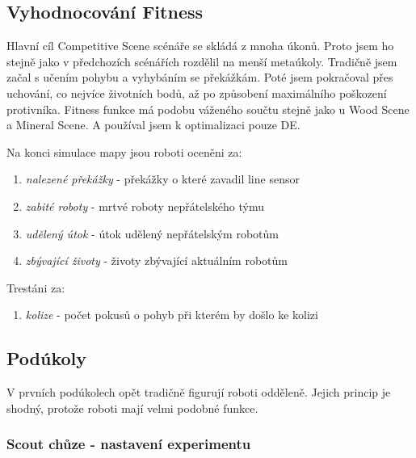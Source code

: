 \subsection{Vyhodnocování Fitness}
Hlavní cíl Competitive Scene scénáře se skládá z mnoha úkonů. Proto jsem ho stejně jako v předchozích scénářích rozdělil na menší metaúkoly. Tradičně jsem začal s učením pohybu a vyhybáním se překážkám. Poté jsem pokračoval přes uchování, co nejvíce životních bodů, až po způsobení maximálního poškození protivníka. Fitness funkce má podobu váženého součtu stejně jako u Wood Scene a Mineral Scene. A používal jsem k optimalizaci pouze DE. 
\par 
Na konci simulace mapy jsou roboti oceněni za:  
\begin{enumerate}
	\item \textit{nalezené překážky} - překážky o které zavadil line sensor
	\item \textit{zabité roboty} - mrtvé roboty nepřátelského týmu
	\item \textit{udělený útok} - útok udělený nepřátelským robotům 
	\item \textit{zbývající životy} - životy zbývající aktuálním robotům
\end{enumerate}
Trestáni za:
\begin{enumerate}
	\item \textit{kolize} - počet pokusů o pohyb při kterém by došlo ke kolizi 
\end{enumerate}

\subsection{Podúkoly}
V prvních podúkolech opět tradičně figurují roboti odděleně. Jejich princip je shodný, protože roboti mají velmi podobné funkce. 
\clearpage

\subsubsection{Scout chůze - nastavení experimentu}

